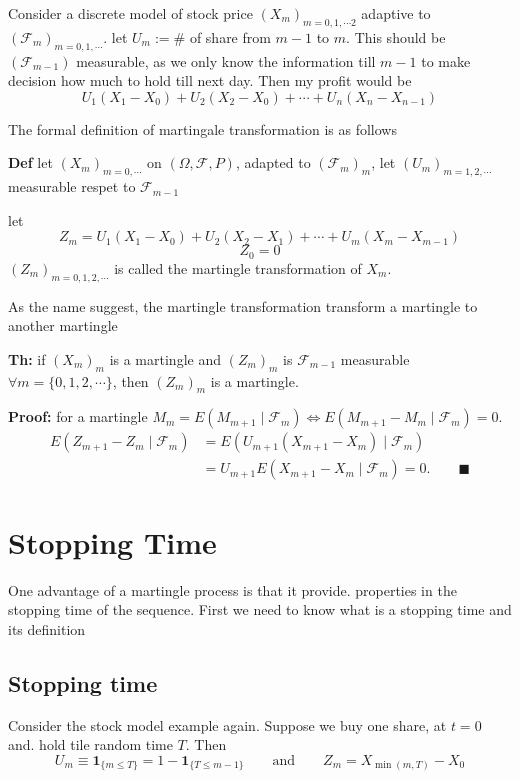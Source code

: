 \documentclass[
  letterpaper,
  DIV=11,
  numbers=noendperiod]{scrreprt}
\theoremstyle{definition}
\theoremstyle{plain}
\theoremstyle{plain}
\theoremstyle{definition}
\theoremstyle{plain}
\theoremstyle{plain}
\theoremstyle{remark}
\begin{document}
Consider a discrete model of stock price \((X_m)_{m=0,1,\cdots 2}\)
adaptive to \((\mathcal{F}_m)_{m=0,1,\cdots}\). let \(U_m := \#\) of
share from \(m-1\) to \(m\). This should be \((\mathcal{F}_{m-1})\)
measurable, as we only know the information till \(m-1\) to make
decision how much to hold till next day. Then my profit would be \[
U_1(X_1 - X_0) + U_2(X_2 - X_0) + \cdots + U_n(X_n - X_{n-1})
\]

The formal definition of martingale transformation is as follows

\textbf{Def} let \((X_m)_{m=0,\cdots}\) on \((\Omega, \mathcal{F}, P)\),
adapted to \((\mathcal{F}_m)_m\), let \((U_m)_{m=1,2,\cdots}\)
measurable respet to \(\mathcal{F}_{m-1}\)

let \[
Z_m = U_1(X_1 - X_0) + U_2(X_2 - X_1) + \cdots + U_m(X_m - X_{m-1})
\] \[
Z_0 = 0
\] \((Z_m)_{m=0,1,2,\cdots}\) is called the martingle transformation of
\(X_m\).

As the name suggest, the martingle transformation transform a martingle
to another martingle

\textbf{Th:} if \((X_m)_m\) is a martingle and \((Z_m)_m\) is
\(\mathcal{F}_{m-1}\) measurable \(\forall m = \{0, 1, 2, \cdots\}\),
then \((Z_m)_m\) is a martingle.

\textbf{Proof:} for a martingle
\(M_m = E(M_{m+1} \mid \mathcal{F}_m) \iff E(M_{m+1} - M_m \mid \mathcal{F}_m) = 0\).
\[
\begin{aligned}
E(Z_{m+1} - Z_m \mid \mathcal{F}_m)
&= E(U_{m+1}(X_{m+1} - X_m) \mid \mathcal{F}_m) \\
&= U_{m+1} E(X_{m+1} - X_m \mid \mathcal{F}_m) = 0. \qquad \blacksquare
\end{aligned}
\]

\chapter{Stopping Time}\label{stopping-time}

One advantage of a martingle process is that it provide. properties in
the stopping time of the sequence. First we need to know what is a
stopping time and its definition

\section{Stopping time}\label{stopping-time-1}

Consider the stock model example again. Suppose we buy one share, at
\(t=0\) and. hold tile random time \(T\). Then \[
U_m \equiv \mathbf{1}_{\{m \leq T\}} = 1 - \mathbf{1}_{\{T \leq m-1\}} \qquad \text{and} \qquad Z_m = X_{\min(m,T)} - X_0
\]
\end{document}
